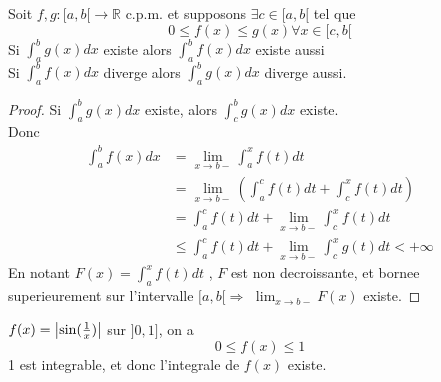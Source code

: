\documentclass[../main.tex]{subfiles}
\begin{document}
\begin{thm}\label{thm:Critere de Comparaisoncritere_de_comparaison}
	Soit $f,g: [ a,b[ \to \mathbb{R} $ c.p.m. et supposons $\exists c \in [ a,b[ $ tel que
	\[ 
		0 \leq f( x) \leq g( x) \forall x \in [ c,b[ 
	\]
	Si $ \int_{ a }^{ b }g( x) dx$ existe alors $ \int_{ a }^{ b }f( x) dx$ existe aussi\\
	Si $ \int_{ a }^{ b }f( x) dx$ diverge alors $\int_{ a }^{ b }g( x) dx$ diverge aussi.
\end{thm}
\begin{proof}
	Si $\int_{ a }^{ b }g( x) dx$ existe, alors $\int_{ c }^{ b }g( x) dx$ existe.\\
	Donc
	\begin{align*}
		\int_{ a }^{ b }f( x) dx &= \lim_{x \to b-} \int_{ a }^{ x }f( t) dt\\
		&= \lim_{x \to b-} ( \int_{ a }^{ c }f( t) dt + \int_{ c }^{ x }f( t) dt)\\
		&= \int_{ a }^{ c }f( t) dt + \lim_{x \to b-} \int_{ c }^{ x }f( t) dt\\
		&\leq \int_{ a }^{ c }f( t) dt	+ \lim_{x \to b-} \int_{ c }^{ x }g( t) dt < + \infty 
	\end{align*}
	En notant $F( x) = \int_{ a }^{ x }f( t) dt$ , $F$ est non decroissante, et bornee superieurement sur l'intervalle $[a,b[ \Rightarrow $ $\lim_{x \to b-} F( x) $ existe.	
\end{proof}
\begin{exemple}
	$f( x) = \left\vert\sin( \frac{1}{x})\right\vert$ sur $]0,1]$, on a
	\[ 
		0 \leq f( x) \leq 1
	\]
	1 est integrable, et donc l'integrale de $f( x) $ existe.
\end{exemple}
\end{document}
